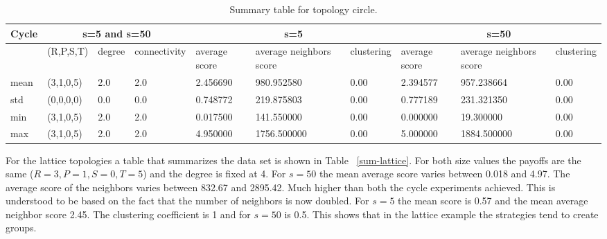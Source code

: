 \begin{table}[!hbtp]
\centering
\begin{adjustbox}{width=1\textwidth}
\small
\begin{tabular}{@{}|l|l|l|l|l|l|l|l|l|l|@{}}
\toprule
Cycle & \multicolumn{3}{c}{s=5 and s=50}  & \multicolumn{3}{c}{s=5}                              & \multicolumn{3}{c}{s=50}                             \\\midrule
       & (R,P,S,T) & degree & connectivity & average score & average neighbors score & clustering & average score & average neighbors score & clustering \\\midrule
mean   & (3,1,0,5) & 2.0    & 2.0          & 2.456690      & 980.952580              & 0.00       & 2.394577      & 957.238664              & 0.00       \\\midrule
std    & (0,0,0,0) & 0.0    & 0.0          & 0.748772      & 219.875803              & 0.00       & 0.777189      & 231.321350              & 0.00       \\\midrule
min    & (3,1,0,5) & 2.0    & 2.0          & 0.017500      & 141.550000              & 0.00       & 0.000000      & 19.300000               & 0.00       \\\midrule
max    & (3,1,0,5) & 2.0    & 2.0          & 4.950000      & 1756.500000             & 0.00       & 5.000000      & 1884.500000             & 0.00       \\ \bottomrule
\end{tabular}
\end{adjustbox}
\caption{Summary table for topology circle.}
\label{sum-cicle}
\end{table}

For the lattice topologies a table that summarizes the data set is shown in Table
~\ref{sum-lattice}. For both size values the payoffs are the same (\(R=3, P=1, S=0, T=5\))
and the degree is fixed at 4. For \(s=50\) the mean average score
varies between 0.018 and 4.97. The average score of the neighbors varies between
832.67 and 2895.42. Much higher than both the cycle experiments achieved. This
is understood to be
based on the fact that the number of neighbors is now doubled. For \(s=5\)
the mean score is 0.57 and the mean average neighbor score 2.45.
The clustering coefficient is 1 and for \(s=50\) is 0.5.
This shows that in the lattice example the strategies tend to create groups.

